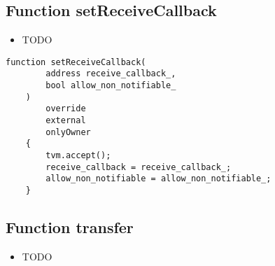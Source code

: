 \subsection{Function setReceiveCallback}

\noindent\begin{itemize}
\item TODO
\end{itemize}

\begin{lstlisting}[firstnumber=550]
    function setReceiveCallback(
        address receive_callback_,
        bool allow_non_notifiable_
    )
        override
        external
        onlyOwner
    {
        tvm.accept();
        receive_callback = receive_callback_;
        allow_non_notifiable = allow_non_notifiable_;
    }
\end{lstlisting}

\subsection{Function transfer}

\noindent\begin{itemize}
\item TODO
\end{itemize}


